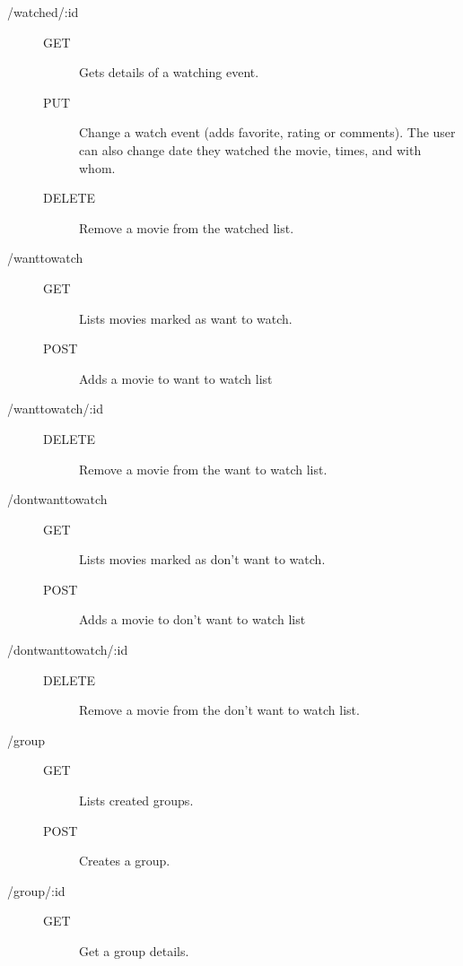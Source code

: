\begin{description}
\begin{description}
    \end{description}
  \item [/watched/:id] \hfill
    \begin{description}
      \item [GET] Gets details of a watching event.
      \item [PUT] Change a watch event (adds favorite, rating or comments). The
        user can also change date they watched the movie, times, and with whom.
      \item [DELETE] Remove a movie from the watched list.
    \end{description}
  \item [/wanttowatch] \hfill
    \begin{description}
      \item [GET] Lists movies marked as want to watch.
      \item [POST] Adds a movie to want to watch list
    \end{description}
  \item [/wanttowatch/:id] \hfill
    \begin{description}
      \item [DELETE] Remove a movie from the want to watch list.
    \end{description}
  \item [/dontwanttowatch] \hfill
    \begin{description}
      \item [GET] Lists movies marked as don't want to watch.
      \item [POST] Adds a movie to don't want to watch list
    \end{description}
  \item [/dontwanttowatch/:id] \hfill
    \begin{description}
      \item [DELETE] Remove a movie from the don't want to watch list.
    \end{description}
  \item [/group] \hfill
    \begin{description}
      \item [GET] Lists created groups.
      \item [POST] Creates a group.
    \end{description}
  \item [/group/:id] \hfill
    \begin{description}
      \item [GET] Get a group details.

\end{description}
\end{description}
